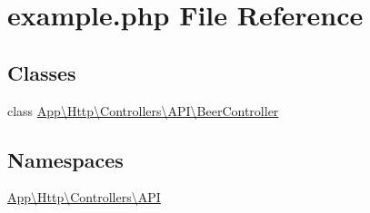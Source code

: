 \hypertarget{example_8php}{}\section{example.\+php File Reference}
\label{example_8php}
\subsection*{Classes}
\begin{DoxyCompactItemize}
\item 
class \mbox{\hyperlink{class_app_1_1_http_1_1_controllers_1_1_a_p_i_1_1_beer_controller}{App\textbackslash{}\+Http\textbackslash{}\+Controllers\textbackslash{}\+A\+P\+I\textbackslash{}\+Beer\+Controller}}
\end{DoxyCompactItemize}
\subsection*{Namespaces}
\begin{DoxyCompactItemize}
\item 
 \mbox{\hyperlink{namespace_app_1_1_http_1_1_controllers_1_1_a_p_i}{App\textbackslash{}\+Http\textbackslash{}\+Controllers\textbackslash{}\+A\+PI}}
\end{DoxyCompactItemize}
